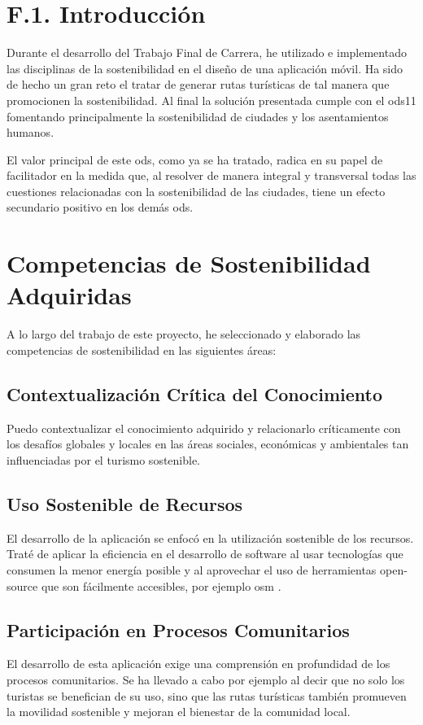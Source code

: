 
\section{F.1. Introducción}
Durante el desarrollo del Trabajo Final de Carrera, he utilizado e implementado las disciplinas de la sostenibilidad en el diseño de una aplicación móvil. Ha sido de hecho un gran reto el tratar de generar rutas turísticas de tal manera que promocionen la sostenibilidad. Al final la solución presentada cumple con el \acrfull{ods11} fomentando principalmente la sostenibilidad de ciudades y los asentamientos humanos.

El valor principal de este \acrfull{ods}, como ya se ha tratado, radica en su papel de facilitador en la medida que, al resolver de manera integral y transversal todas las cuestiones relacionadas con la sostenibilidad de las ciudades, tiene un efecto secundario positivo en los demás \acrshort{ods}.

\section{Competencias de Sostenibilidad Adquiridas}
A lo largo del trabajo de este proyecto, he seleccionado y elaborado las competencias de sostenibilidad en las siguientes áreas:
	
	\subsection{Contextualización Crítica del Conocimiento}
	Puedo contextualizar el conocimiento adquirido y relacionarlo críticamente con los desafíos globales y locales en las áreas sociales, económicas y ambientales tan influenciadas por el turismo sostenible.
		
	\subsection{Uso Sostenible de Recursos}
	El desarrollo de la aplicación se enfocó en la utilización sostenible de los recursos. Traté de aplicar la eficiencia en el desarrollo de software al usar tecnologías que consumen la menor energía posible y al aprovechar el uso de herramientas open-source que son fácilmente accesibles, por ejemplo \acrfull{osm} .
		
	\subsection{Participación en Procesos Comunitarios}
	El desarrollo de esta aplicación exige una comprensión en profundidad de los procesos comunitarios. Se ha llevado a cabo por ejemplo al decir que no solo los turistas se benefician de su uso, sino que las rutas turísticas también promueven la movilidad sostenible y mejoran el bienestar de la comunidad local.
			
